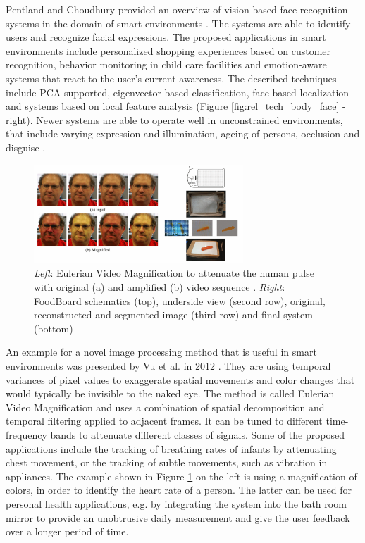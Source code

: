 Pentland and Choudhury provided an overview of vision-based face recognition systems in the domain of smart environments \cite{pentland2000face}. The systems are able to identify users and recognize facial expressions. The proposed applications in smart environments include personalized shopping experiences based on customer recognition, behavior monitoring in child care facilities and emotion-aware systems that react to the user's current awareness. The described techniques include PCA-supported, eigenvector-based classification, face-based localization and systems based on local feature analysis (Figure \ref{fig:rel_tech_body_face} - right). Newer systems are able to operate well in unconstrained environments, that include varying expression and illumination, ageing of persons, occlusion and disguise \cite{wright2009robust}.
\begin{figure}[h]
\centering
\includegraphics[width=0.7\textwidth]{images/rgb_euler_food}
\caption{\emph{Left}: Eulerian Video Magnification to attenuate the human pulse with original (a) and amplified (b) video sequence  \cite{Wu2012}. \emph{Right}: FoodBoard schematics (top), underside view (second row), original, reconstructed and segmented image (third row) and final system (bottom) \cite{pham2013foodboard}}
\label{fig:rgb_euler_food}
\end{figure}

An example for a novel image processing method that is useful in smart environments was presented by Vu et al. in 2012 \cite{Wu2012}. They are using  temporal variances of pixel values to exaggerate spatial movements and color changes that would typically be invisible to the naked eye. The method is called Eulerian Video Magnification and uses a combination of spatial decomposition and temporal filtering applied to adjacent frames. It can be tuned to different time-frequency bands to attenuate different classes of signals. Some of the proposed applications include the tracking of breathing rates of infants by attenuating chest movement, or the tracking of subtle movements, such as vibration in appliances. The example shown in Figure \ref{fig:rgb_euler_food} on the left is using a magnification of colors, in order to identify the heart rate of a person. The latter can be used for personal health applications, e.g. by integrating the system into the bath room mirror to provide an unobtrusive daily measurement and give the user feedback over a longer period of time.

